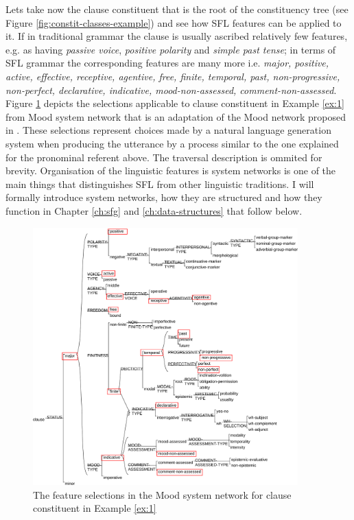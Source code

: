 Lets take now the clause constituent that is the root of the constituency tree (see Figure \ref{fig:constit-classes-example}) and see how SFL features can be applied to it. If in traditional grammar the clause is usually ascribed relatively few features, e.g. as having \textit{passive voice}, \textit{positive polarity} and \textit{simple past tense}; in terms of SFL grammar the corresponding features are many more i.e. \textit{major, positive, active, effective, receptive, agentive, free, finite, temporal, past, non-progressive, non-perfect, declarative, indicative, mood-non-assessed, comment-non-assessed}. Figure \ref{fig:mood-selections} depicts the selections applicable to clause constituent in Example \ref{ex:1} from Mood system network that is an adaptation of the Mood network proposed in \citet[162]{Halliday2013}. These selections represent choices made by a natural language generation system when producing the utterance by a process similar to the one explained for the pronominal referent above. The traversal description is ommited for brevity. Organisation of the linguistic features is system networks is one of the main things that distinguishes SFL from other linguistic traditions. I will formally introduce system networks, how they are structured and how they function in Chapter \ref{ch:sfg} and \ref{ch:data-structures} that follow below. 

\begin{figure}[!ht]
    \centering      
    \includegraphics[width=0.91\textwidth]{Figures/Example/mood-selections.pdf}      
    \caption{The feature selections in the Mood system network for clause constituent in Example \ref{ex:1}}
    \label{fig:mood-selections}
\end{figure}

